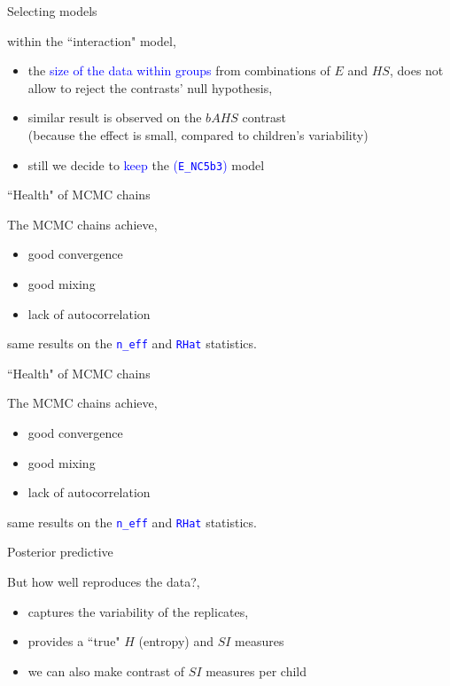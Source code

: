 \begin{lhframe}[rhgraphic={\texttt{[image: contrasts.png]}}]
	{Selecting models}
	
	within the ``interaction" model,
	\begin{itemize}
		\item the \textcolor{blue}{size of the data within groups} from combinations of $E$ and $HS$, does not allow to reject the contrasts' null hypothesis,
		\item similar result is observed on the $bAHS$ contrast \\
		{\small (because the effect is small, compared to children's variability)}
		\item still we decide to \textcolor{blue}{keep} the \textcolor{blue}{(\texttt{E\_NC5b3})} model 
	\end{itemize}
\end{lhframe}
%
%
\begin{lhframe}[rhgraphic={\texttt{[image: chains\_real1.pdf]}}]
	{``Health" of MCMC chains}
	
	The MCMC chains achieve,
	\begin{itemize}
		\item good convergence
		\item good mixing
		\item lack of autocorrelation
	\end{itemize}
	
	same results on the \textcolor{blue}{ \texttt{n\_eff} } and \textcolor{blue}{ \texttt{RHat} } statistics.
\end{lhframe}
%
%
\begin{lhframe}[rhgraphic={\texttt{[image: chains\_real2.pdf]}}]
	{``Health" of MCMC chains}
	
	The MCMC chains achieve,
	\begin{itemize}
		\item good convergence
		\item good mixing
		\item lack of autocorrelation
	\end{itemize}
	
	same results on the \textcolor{blue}{ \texttt{n\_eff} } and \textcolor{blue}{ \texttt{RHat} } statistics.
\end{lhframe}
%
%
\begin{lhframe}[rhgraphic={\texttt{[image: posterior\_predictive\_real.pdf]}}]
	{Posterior predictive}
	
	But how well reproduces the data?,
	\begin{itemize}
		\item captures the variability of the replicates,
		\item provides a ``true" $H$ (entropy) and $SI$ measures
		\item we can also make contrast of $SI$ measures per child
	\end{itemize}
\end{lhframe}
